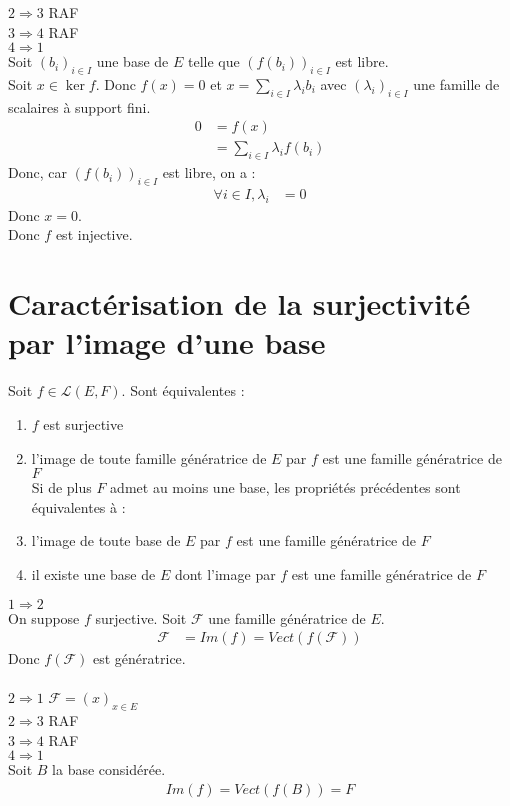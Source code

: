 \documentclass[../main.tex]{subfiles}
\begin{document}
$\boxed{2 \Rightarrow 3}$ RAF \\

$\boxed{3 \Rightarrow 4}$ RAF \\

$\boxed{4 \Rightarrow 1}$ \\
Soit $(b_i)_{i\in I}$ une base de $E$ telle que $(f(b_i))_{i\in I}$ est libre. \\
Soit $x\in \ker f$. Donc $f(x) = 0$ et $x = \sum\limits_{i\in I} \lambda_i b_i$ avec $(\lambda_i)_{i\in I}$ une famille de scalaires à support fini. \\
\begin{align*}
    0 &= f(x) \\
    &= \sum_{i\in I} \lambda_i f(b_i)
\end{align*}
Donc, car $(f(b_i))_{i\in I}$ est libre, on a : 
\begin{align*}
    \forall i \in I, \lambda_i &= 0
\end{align*}
Donc $x = 0$. \\
Donc $f$ est injective. 

\section{Caractérisation de la surjectivité par l'image d'une base}
\begin{tcolorbox}[title=Propostion 21.69, title filled=false, colframe=lightblue, colback=lightblue!10!white]
    Soit $f\in \mathcal{L}(E, F)$. Sont équivalentes :
    \begin{enumerate}
        \item $f$ est surjective
        \item l'image de toute famille génératrice de $E$ par $f$ est une famille génératrice de $F$ \\
        Si de plus $F$ admet au moins une base, les propriétés précédentes sont équivalentes à :
        \item l'image de toute base de $E$ par $f$ est une famille génératrice de $F$
        \item il existe une base de $E$ dont l'image par $f$ est une famille génératrice de $F$
    \end{enumerate}
\end{tcolorbox}

$\boxed{1 \Rightarrow 2}$ \\
On suppose $f$ surjective. Soit $\mathcal{F}$ une famille génératrice de $E$. \\
\begin{align*}
    \mathcal{F} &= Im(f) = Vect(f(\mathcal{F}))
\end{align*}
Donc $f(\mathcal{F})$ est génératrice. \\ \\

$\boxed{2 \Rightarrow 1}$ $\mathcal{F} = (x)_{x\in E}$ \\

$\boxed{2 \Rightarrow 3}$ RAF \\

$\boxed{3 \Rightarrow 4}$ RAF \\

$\boxed{4 \Rightarrow 1}$ \\
Soit $B$ la base considérée. \\
\begin{align*}
    Im(f) = Vect(f(B)) = F
\end{align*}
\end{document}
